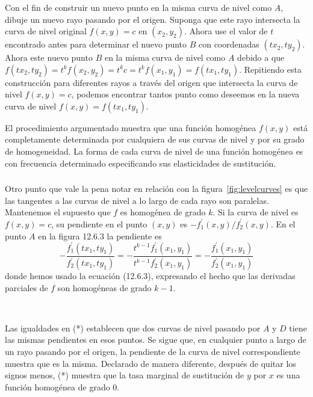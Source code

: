 \begin{frame}[t]
\frametitle{\subsecname}
Con el fin de construir un nuevo punto en la misma curva de nivel como $A$, dibuje un nuevo rayo pasando por el origen. Suponga que este rayo intersecta la curva de nivel original $f\left(x,y\right)=c$ en $\left(x_{2},y_{2}\right)$. Ahora use el valor de $t$ encontrado antes para determinar el nuevo punto $B$ con coordenadas $\left(tx_{2},ty_{2}\right)$. Ahora este nuevo punto $B$ en la misma curva de nivel como $A$ debido a que $f\left(tx_{2},ty_{2}\right)=t^{k}f\left(x_{2},y_{2}\right)=t^{k}c=t^{k}f\left(x_{1},y_{1}\right)=f\left(tx_{1},ty_{1}\right)$. Repitiendo esta construcción para diferentes rayos a través del origen que intersecta la curva de nivel $f\left(x,y\right)=c$, podemos encontrar tantos punto como deseemos en la nueva curva de nivel $f\left(x,y\right)=f\left(tx_{1},ty_{1}\right)$.

El procedimiento argumentado muestra que una función homogénea $f\left(x,y\right)$ está completamente determinada por cualquiera de sus curvas de nivel y por su grado de homogeneidad. La forma de cada curva de nivel de una función homogénea es con frecuencia determinado especificando sus elasticidades de sustitución.
\end{frame}

\begin{frame}[t]
\frametitle{\subsecname}
Otro punto que vale la pena notar en relación con la figura~\ref{fig:levelcurves} es que las tangentes a las curvas de nivel a lo largo de cada rayo son paralelas. Mantenemos el supuesto que $f$ es homogénea de grado $k$. Si la curva de nivel es $f\left(x,y\right)=c$, su pendiente en el punto $\left(x,y\right)$ es $-f^{\prime}_{1}\left(x,y\right)/f^{\prime}_{2}\left(x,y\right)$. En el punto $A$ en la figura 12.6.3 la pendiente es
\begin{equation}
-\frac{f^{\prime}_{1}\left(tx_{1},ty_{1}\right)}{f^{\prime}_{2}\left(tx_{1},ty_{1}\right)}=-\frac{t^{k-1}f^{\prime}_{1}\left(x_{1},y_{1}\right)}{t^{k-1}f^{\prime}_{2}\left(x_{1},y_{1}\right)}=-\frac{f^{\prime}_{1}\left(x_{1},y_{1}\right)}{f^{\prime}_{2}\left(x_{1},y_{1}\right)}\tag{*}
\end{equation}
donde hemos usado la ecuación (12.6.3), expresando el hecho que las derivadas parciales de $f$ son homogéneas de grado $k-1$.

\	

Las igualdades en (*) establecen que dos curvas de nivel pasando por $A$ y $D$ tiene las mismas pendientes en esos puntos. Se sigue que, en cualquier punto a largo de un rayo pasando por el origen, la pendiente de la curva de nivel correspondiente muestra que es la misma. Declarado de manera diferente, después de quitar los signos menos, (*) muestra que la tasa marginal de sustitución de $y$ por $x$ es una función homogénea de grado $0$.
\end{frame}

